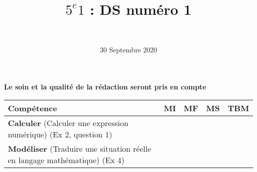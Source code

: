 \documentclass[a4paper,12pt]{exam}
\author{\ }
\date{30 Septembre 2020}
\title{$5^e 1$ : DS num\'ero 1}
\begin{document}
%	

	\maketitle
	
\begin{center}
	\textbf{Le soin et la qualité de la rédaction seront pris en compte}
\end{center}

\begin{small}
	\begin{center}
		\begin{tabular}{|@{\ }l@{\ }|@{\ }c@{\ }|@{\ }c@{\ }|@{\ }c@{\ }|@{\ }c@{\ }|}
			\hline
			\textbf{Compétence} & \textbf{MI} & \textbf{MF} & \textbf{MS} & \textbf{TBM} \\
			\hline
			\textbf{Calculer} (Calculer une expression numérique) (Ex 2, question 1)&  \ \ & \ \ & \ \ & \ \  \\
			\hline	
			\textbf{Modéliser} (Traduire une situation réelle en langage mathématique) (Ex 4)& \ \ & \ \ &  \ \  & \ \ \\
			\hline
		\end{tabular}
	\end{center}
\end{small}	

	
	
	



%

%






\label{LastPage}

%
\end{document}
